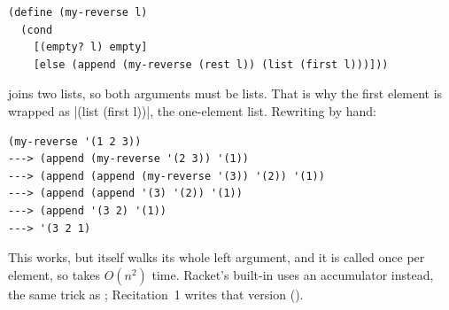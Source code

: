 \begin{lstlisting}
(define (my-reverse l)
  (cond
    [(empty? l) empty]
    [else (append (my-reverse (rest l)) (list (first l)))]))
\end{lstlisting}

 joins two lists, so both arguments must be lists. That is why the first element is wrapped as \rkt|(list (first l))|, the one-element list. Rewriting by hand:
\begin{lstlisting}[style=repl]
(my-reverse '(1 2 3))
---> (append (my-reverse '(2 3)) '(1))
---> (append (append (my-reverse '(3)) '(2)) '(1))
---> (append (append '(3) '(2)) '(1))
---> (append '(3 2) '(1))
---> '(3 2 1)
\end{lstlisting}

This works, but  itself walks its whole left argument, and it is called once per element, so  takes $O(n^2)$ time. Racket's built-in  uses an accumulator instead, the same trick as ; Recitation~1 writes that version ().
